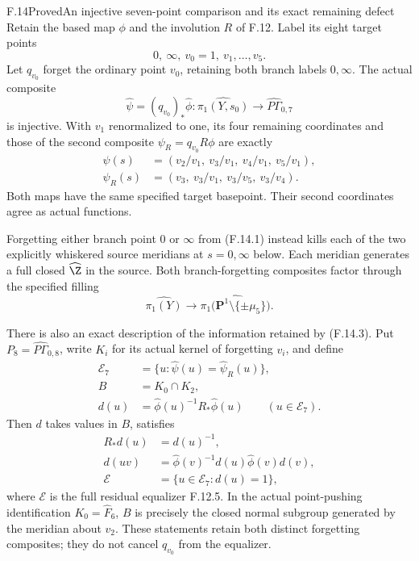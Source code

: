 \begin{claim}{F.14}{Proved}{An injective seven-point comparison and its exact remaining defect}
Retain the based map $\phi$ and the involution $R$ of F.12.
Label its eight target points
\[
             0,\ \infty,\ v_0=1,\ v_1,\ldots,v_5 .
                                                               \tag{F.14.1}
\]
Let $q_{v_0}$ forget the ordinary point $v_0$, retaining
both branch labels $0,\infty$.  The actual composite
\[
 \widehat\psi=(q_{v_0})_*\widehat\phi:
       \widehat{\pi_1(Y,s_0)}
                     \longrightarrow\widehat{P\Gamma}_{0,7}
                                                               \tag{F.14.2}
\]
is injective.  With $v_1$ renormalized to one, its four
remaining coordinates and those of the second composite
$\psi_R=q_{v_0}R\phi$ are exactly
\[
 \begin{split}
 \psi(s)&=(v_2/v_1,\ v_3/v_1,\ v_4/v_1,\ v_5/v_1),\\
 \psi_R(s)&=(v_3,\ v_3/v_1,\ v_3/v_5,\ v_3/v_4).
 \end{split}                                                   \tag{F.14.3}
\]
Both maps have the same specified target basepoint.
Their second coordinates agree as actual functions.

Forgetting either branch point $0$ or $\infty$ from
(F.14.1) instead kills each of the two explicitly
whiskered source meridians at $s=0,\infty$ below.
Each meridian generates a full closed $\widehat\Z$
in the source.  Both branch-forgetting composites
factor through the specified filling
\[
 \widehat{\pi_1(Y)}
       \longrightarrow
 \widehat{\pi_1\bigl(\mathbf P^1\setminus\{\pm\mu_5\}\bigr)} .
                                                               \tag{F.14.4}
\]

There is also an exact description of the information
retained by (F.14.3).  Put $P_8=\widehat{P\Gamma}_{0,8}$,
write $K_i$ for its actual kernel of forgetting $v_i$,
and define
\[
 \begin{split}
 \mathcal E_7&=\{u:\widehat\psi(u)=\widehat\psi_R(u)\},\\
 B&=K_0\cap K_2,\\
 d(u)&=\widehat\phi(u)^{-1}R_*\widehat\phi(u)
                         \qquad(u\in\mathcal E_7).
 \end{split}                                                   \tag{F.14.5}
\]
Then $d$ takes values in $B$, satisfies
\[
 \begin{split}
 R_*d(u)&=d(u)^{-1},\\
 d(uv)&=\widehat\phi(v)^{-1}d(u)\widehat\phi(v)d(v),\\
 \mathcal E&=\{u\in\mathcal E_7:d(u)=1\},
 \end{split}                                                   \tag{F.14.6}
\]
where $\mathcal E$ is the full residual equalizer F.12.5.
In the actual point-pushing identification $K_0=\widehat F_6$,
$B$ is precisely the closed normal subgroup generated by
the meridian about $v_2$.  These statements retain both
distinct forgetting composites; they do not cancel
$q_{v_0}$ from the equalizer.
\end{claim}

